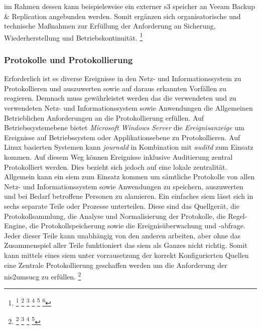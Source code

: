 \documentclass[11pt,a4paper,hidelinks]{article}   %
\begin{document}
im Rahmen dessen kann beispielsweise ein externer \gls{s3} speicher an Veeam Backup \& Replication angebunden werden. Somit ergänzen sich organisatorische und technische Maßnahmen zur Erfüllung der Anforderung an Sicherung, Wiederherstellung und Betriebskonti­nuität.
            \footnote{
                \footcite[Vgl.][, S. 1 - 3]{9781931332767}
                \footcite[Vgl.][, S. 244]{9781849285391}
                \footcite[Vgl.][, S. 228 – 230]{9781118094839}
                \footcite[Vgl.][, S. 3, 24 - 33]{9781837630097} %
                \footcite[Vgl.][, S. 3 , 39 - 40 \& 47 - 48]{9781803236810} %
                \footcite[Vgl.][, §13]{KRITIS-DachG}
            }
            \subsubsection{Protokolle und Protokollierung}
            Erforderlich ist es diverse Ereignisse in den Netz- und Informationssystem zu Protokollieren und auszuwerten sowie auf daraus erkannten Vorfällen zu reagieren. Demnach muss gewährleistet werden das die verwendeten und zu verwendeten Netz- und Informationssystem sowie Anwendungen die Allgemeinen Betrieblichen Anforderungen an die Protokollierung erfüllen. Auf Betriebssystemebene bietet \emph{Microsoft Windows Server} die \emph{Ereignisanzeige} um Ereignisse auf Betriebssystem oder Applikationsebene zu Protokollieren. Auf Linux basierten Systemen kann \emph{journald} in Kombination mit \emph{auditd} zum Einsatz kommen. Auf diesem Weg können Ereignisse inklusive Auditierung zentral Protokolliert werden. Dies bezieht sich jedoch auf eine lokale zentralität. Allgemein kann ein \gls{siem} zum Einsatz kommen um sämtliche Protokolle von allen Netz- und Informationssystem sowie Anwendungen zu speichern, auszuwerten und bei Bedarf betroffene Personen zu alamieren. Ein einfaches \gls{siem} lässt sich in sechs separate Teile oder Prozesse unterteilen. Diese sind das Quellgerät, die Protokollsammlung, die Analyse und Normalisierung der Protokolle, die Regel-Engine, die Protokollspeicherung sowie die Ereignisüberwachung und -abfrage. Jeder dieser Teile kann unabhängig von den anderen arbeiten, aber ohne das Zusammenspiel aller Teile funktioniert das \gls{siem} als Ganzes nicht richtig. Somit kann mittels eines \gls{siem} unter vorrausetzung der korrekt Konfigurierten Quellen eine Zentrale Protokollierung geschaffen werden um die Anforderung der \gls{nis2umsucg} zu erfüllen.
            \footnote{
                \footcite[Vgl.][, S. 106 - 107]{iso27002-2022}
                \footcite[Vgl.][, S. 463 - 469 \& 516 - 519]{9781838981778}
                \footcite[Vgl.][, S. 529 - 533]{9781305078628}
                \footcite[Vgl.][, S. 78 - 91]{9780071701082}
            }
\end{document}
